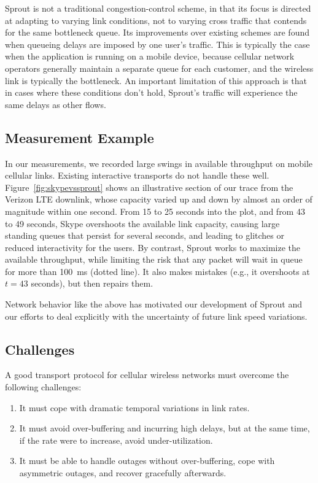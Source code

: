 Sprout is not a traditional congestion-control scheme, in that its
focus is directed at adapting to varying link conditions, not to
varying cross traffic that contends for the same bottleneck queue. Its
improvements over existing schemes are found when queueing delays are
imposed by one user's traffic. This is typically the case
when the application is running on a mobile device, because cellular
network operators generally maintain a separate queue for each
customer, and the wireless link is typically the bottleneck.  An
important limitation of this approach is that in cases where these
conditions don't hold, Sprout's traffic will experience the same
delays as other flows.

\subsection{Measurement Example}

In our measurements, we recorded large swings in available throughput
on mobile cellular links. Existing interactive transports do
not handle these well. Figure~\ref{fig:skypevssprout} shows an
illustrative section of our trace from the Verizon LTE downlink, whose
capacity varied up and down by almost an order of magnitude within one
second. From 15 to 25 seconds into the plot, and from 43 to 49 seconds,
Skype overshoots the available link capacity, causing large standing
queues that persist for several seconds, and leading to glitches or
reduced interactivity for the users. By contrast, Sprout works to
maximize the available throughput, while limiting the risk that any
packet will wait in queue for more than 100~ms (dotted line). It also
makes mistakes (e.g., it overshoots at $t=43$ seconds), but then
repairs them.

Network behavior like the above has motivated our development of
Sprout and our efforts to deal explicitly with the uncertainty of
future link speed variations.

\subsection{Challenges}

A good transport protocol for cellular wireless networks
must overcome the following challenges:
\begin{enumerate}
\item It must cope with dramatic temporal variations in link rates.
\item It must avoid over-buffering and incurring high delays, but at
  the same time, if the rate were to increase, avoid
  under-utilization.
\item It must be able to handle outages without over-buffering, cope
  with asymmetric outages, and recover gracefully afterwards.
\end{enumerate}

